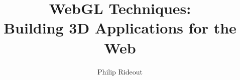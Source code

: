 \documentclass{book}
\title{WebGL Techniques:\\Building 3D Applications for the Web}
\date{}
\author{Philip Rideout}
\begin{document}
\mainmatter
 \renewcommand{\chaptermark}[1]{\markboth{Chapter \thechapter. #1}{}}
 \renewcommand{\sectionmark}[1]{\markright{\thesection. #1}}




\def\thesection {Recipe \arabic{section}:}
\def\thesubsection {\arabic{section}.\arabic{subsection}}
\renewcommand{\sectionmark}[1]{\markright{\thesection\ #1}}


\makeatletter
\renewcommand\section{\@startsection {section}{1}{\z@}%
                                   {0pt}%
                                   {0pt}%
                                   {\vphantom}}
\makeatother

\newcommand{\definerecipe}[4]
{
	\vspace{0.1in}
	\marginpar { \raggedright \tiny
		\vspace{0.3in}
		#2
	}
	\section{#1} \ \\
	\addcontentsline{toc}{section}{#1}
	\mbox{ \colorbox{bg}{\begin{minipage}{4in}
	\vspace{0.05in}
	\raggedright \Large \textbf{\thesection\ #1} \normalsize
	\vspace{0.05in}
	\setlength\fboxsep{0pt}
	\begin{tabular}{ l p{2.15in} }
	 \vtop{\vspace{0pt}\hbox{\fbox{\texttt{[image: ../media/screenshots/\#3]}} }} &
	 \vtop{\vspace{0pt}\parbox{2.15in}{\noindent\small\textsf{#4} } }\\
	\end{tabular}
	\vspace{0.05in}
	\end{minipage} } }
	\vspace{0.2in}
}

%
%
%
%
%
%



%
%
\end{document}
